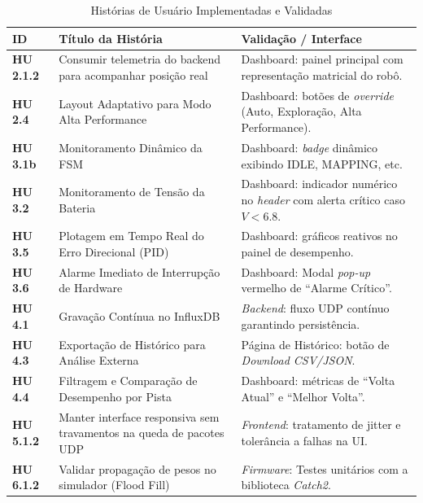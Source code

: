 \begin{table}[H]
    \centering
    \caption{Histórias de Usuário Implementadas e Validadas}
    \label{tab:historias_usuario_implementadas}
    \begin{tabular}{|p{1.5cm}|p{6.5cm}|p{6cm}|}
        \hline
        \textbf{ID} & \textbf{Título da História} & \textbf{Validação / Interface} \\ \hline
        \textbf{HU 2.1.2} & Consumir telemetria do backend para acompanhar posição real & Dashboard: painel principal com representação matricial do robô. \\ \hline
        \textbf{HU 2.4} & Layout Adaptativo para Modo Alta Performance & Dashboard: botões de \textit{override} (Auto, Exploração, Alta Performance). \\ \hline
        \textbf{HU 3.1b} & Monitoramento Dinâmico da FSM & Dashboard: \textit{badge} dinâmico exibindo IDLE, MAPPING, etc. \\ \hline
        \textbf{HU 3.2} & Monitoramento de Tensão da Bateria & Dashboard: indicador numérico no \textit{header} com alerta crítico caso $V < 6.8$. \\ \hline
        \textbf{HU 3.5} & Plotagem em Tempo Real do Erro Direcional (PID) & Dashboard: gráficos reativos no painel de desempenho. \\ \hline
        \textbf{HU 3.6} & Alarme Imediato de Interrupção de Hardware & Dashboard: Modal \textit{pop-up} vermelho de ``Alarme Crítico''. \\ \hline
        \textbf{HU 4.1} & Gravação Contínua no InfluxDB & \textit{Backend}: fluxo UDP contínuo garantindo persistência. \\ \hline
        \textbf{HU 4.3} & Exportação de Histórico para Análise Externa & Página de Histórico: botão de \textit{Download CSV/JSON}. \\ \hline
        \textbf{HU 4.4} & Filtragem e Comparação de Desempenho por Pista & Dashboard: métricas de ``Volta Atual'' e ``Melhor Volta''. \\ \hline
        \textbf{HU 5.1.2} & Manter interface responsiva sem travamentos na queda de pacotes UDP & \textit{Frontend}: tratamento de jitter e tolerância a falhas na UI. \\ \hline
        \textbf{HU 6.1.2} & Validar propagação de pesos no simulador (Flood Fill) & \textit{Firmware}: Testes unitários com a biblioteca \textit{Catch2}. \\ \hline
    \end{tabular}
\end{table}

